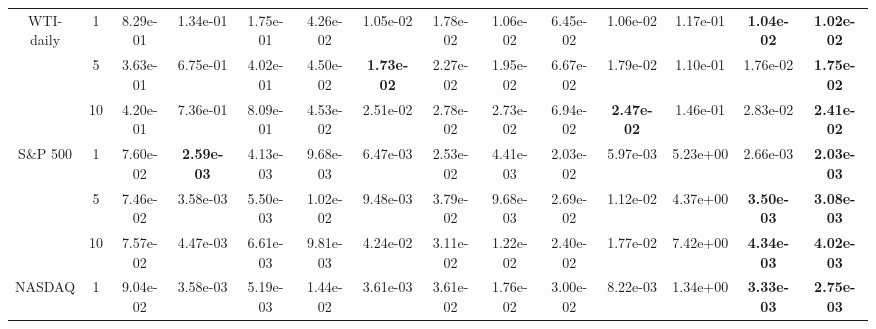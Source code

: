 \begin{table*}[!t]
{\begin{tabular}{cccccccccccccc}
            \multirowcell{3}{WTI-\\daily}    & 1                  & 8.29e-01                        & 1.34e-01                     & 1.75e-01                   & 4.26e-02                     & 1.05e-02          & 1.78e-02          & 1.06e-02 & 6.45e-02 & 1.06e-02          & 1.17e-01 & \textbf{1.04e-02} & \textbf{1.02e-02}\s \\ \cmidrule(l){3-14}
                                     & 5                  & 3.63e-01                        & 6.75e-01                     & 4.02e-01                   & 4.50e-02                     & \textbf{1.73e-02}\s & 2.27e-02          & 1.95e-02 & 6.67e-02 & 1.79e-02          & 1.10e-01 & 1.76e-02          & \textbf{1.75e-02} \\ \cmidrule(l){3-14}
                                     & 10                 & 4.20e-01                        & 7.36e-01                     & 8.09e-01                   & 4.53e-02                     & 2.51e-02          & 2.78e-02          & 2.73e-02 & 6.94e-02 & \textbf{2.47e-02} & 1.46e-01 & 2.83e-02          & \textbf{2.41e-02}\s \\ \cmidrule(l){2-14}
            \multirow{3}{*}{S\&P 500}      & 1                  & 7.60e-02                        & \textbf{2.59e-03}            & 4.13e-03                   & 9.68e-03                     & 6.47e-03          & 2.53e-02          & 4.41e-03 & 2.03e-02 & 5.97e-03          & 5.23e+00 & 2.66e-03          & \textbf{2.03e-03}\s \\ \cmidrule(l){3-14}
                                     & 5                  & 7.46e-02                        & 3.58e-03                     & 5.50e-03                   & 1.02e-02                     & 9.48e-03          & 3.79e-02          & 9.68e-03 & 2.69e-02 & 1.12e-02          & 4.37e+00 & \textbf{3.50e-03} & \textbf{3.08e-03}\s \\ \cmidrule(l){3-14}
                                     & 10                 & 7.57e-02                        & 4.47e-03                     & 6.61e-03                   & 9.81e-03                     & 4.24e-02          & 3.11e-02          & 1.22e-02 & 2.40e-02 & 1.77e-02          & 7.42e+00 & \textbf{4.34e-03} & \textbf{4.02e-03}\s \\ \cmidrule(l){2-14}
            \multirow{3}{*}{NASDAQ}  & 1                  & 9.04e-02                        & 3.58e-03                     & 5.19e-03                   & 1.44e-02                     & 3.61e-03          & 3.61e-02          & 1.76e-02 & 3.00e-02 & 8.22e-03          & 1.34e+00 & \textbf{3.33e-03} & \textbf{2.75e-03}\s \\ \cmidrule(l){3-14}

\end{tabular}}
\end{table*}
